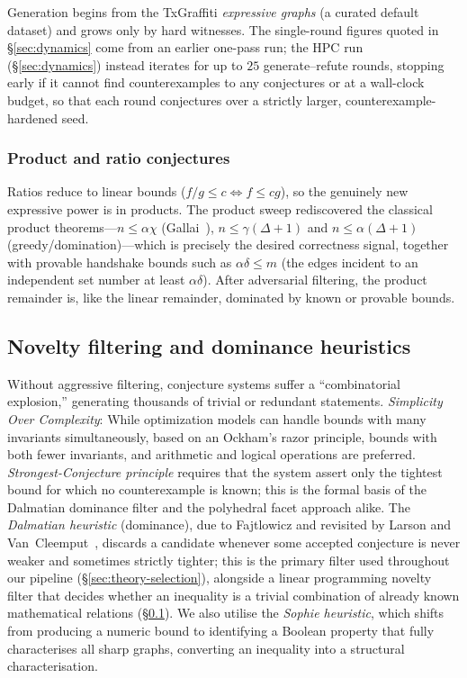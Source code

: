 \documentclass[]{ceurart}
\begin{document}
Generation begins from the TxGraffiti \emph{expressive graphs} (a curated default dataset) and grows only by hard witnesses. The single-round figures quoted in \S\ref{sec:dynamics} come from
an earlier one-pass run; the HPC run (\S\ref{sec:dynamics}) instead iterates for up to $25$
generate--refute rounds, stopping early if it cannot find counterexamples to any conjectures or at a
wall-clock budget, so that each round conjectures over a strictly larger,
counterexample-hardened seed.

\subsubsection{Product and ratio conjectures}
\label{sec:products}
Ratios reduce to linear bounds ($f/g\le c\iff f\le cg$), so the genuinely new
expressive power is in products. The product sweep rediscovered the classical
product theorems---$n\le\alpha\chi$ (Gallai~\cite{gallai1959uber}),
$n\le\gamma(\Delta+1)$ and
$n\le\alpha(\Delta+1)$ (greedy/domination)---which is precisely the desired
correctness signal, together with provable handshake bounds such as $\alpha\delta\le
m$ (the edges incident to an independent set number at least $\alpha\delta$).
After adversarial filtering, the product remainder is, like the linear remainder,
dominated by known or provable bounds.


\subsection{Novelty filtering and dominance heuristics}
\label{sec:heuristics_related}
Without aggressive filtering, conjecture systems suffer a ``combinatorial
explosion,'' generating thousands of trivial or redundant statements. \emph{Simplicity Over Complexity}: While optimization models can handle bounds with many invariants simultaneously, based on an Ockham's razor principle, bounds with both fewer invariants, and arithmetic and logical operations are preferred. \emph{Strongest-Conjecture principle} requires that the system assert only the
tightest bound for which no counterexample is known; this is the formal basis of
the Dalmatian dominance filter and the polyhedral facet approach alike.
The \emph{Dalmatian heuristic} (dominance), due to Fajtlowicz and revisited by
Larson and Van~Cleemput~\cite{fajtlowicz1988conjectures,larson2016dalmatian},
discards a candidate whenever some accepted conjecture is never weaker and
sometimes strictly tighter; this is the primary filter used throughout our pipeline
(\S\ref{sec:theory-selection}), alongside a linear programming novelty filter that decides whether an inequality is a trivial combination of already known mathematical relations (\S\ref{sec:heuristics_related}). We also utilise the \emph{Sophie heuristic}, which shifts from producing a numeric bound to identifying a Boolean property that fully characterises all sharp graphs, converting an inequality into a structural characterisation.
\end{document}
